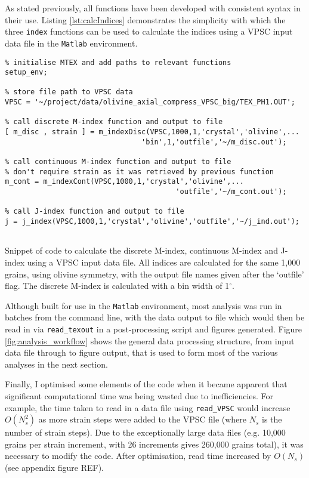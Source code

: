 \documentclass[a4paper,12pt,twoside]{report}
\numberwithin{equation}{chapter}
\begin{document}
As stated previously, all functions have been developed with consistent syntax in their use. Listing \ref{lst:calcIndices} demonstrates the simplicity with which the three \texttt{index} functions can be used to calculate the indices using a VPSC input data file in the \texttt{Matlab} environment.

\begin{program}[htbp] 
   \centering
   \begin{lstlisting}
% initialise MTEX and add paths to relevant functions
setup_env;   
   
% store file path to VPSC data
VPSC = '~/project/data/olivine_axial_compress_VPSC_big/TEX_PH1.OUT';

% call discrete M-index function and output to file
[ m_disc , strain ] = m_indexDisc(VPSC,1000,1,'crystal','olivine',...
                                'bin',1,'outfile','~/m_disc.out');

% call continuous M-index function and output to file
% don't require strain as it was retrieved by previous function
m_cont = m_indexCont(VPSC,1000,1,'crystal','olivine',...
                                        'outfile','~/m_cont.out');

% call J-index function and output to file
j = j_index(VPSC,1000,1,'crystal','olivine','outfile','~/j_ind.out');


 \end{lstlisting}
   \caption{Snippet of code to calculate the discrete M-index, continuous M-index and J-index using a VPSC input data file. All indices are calculated for the same 1,000 grains, using olivine symmetry, with the output file names given after the \lq{}outfile\rq{} flag. The discrete M-index is calculated with a bin width of 1$^\circ$.}
   \label{lst:calcIndices}
\end{program}

Although built for use in the \texttt{Matlab} environment, most analysis was run in batches from the command line, with the data output to file which would then be read in via \texttt{read\_{}texout} in a post-processing script and figures generated. Figure \ref{fig:analysis_workflow} shows the general data processing structure, from input data file through to figure output, that is used to form most of the various analyses in the next section.

Finally, I optimised some elements of the code when it became apparent that significant computational time was being wasted due to inefficiencies. For example, the time taken to read in a data file using \texttt{read\_{}VPSC} would increase $O(N_s^2)$ as more strain steps were added to the VPSC file (where $N_s$ is the number of strain steps). Due to the exceptionally large data files (e.g. 10,000 grains per strain increment, with 26 increments gives 260,000 grains total), it was necessary to modify the code. After optimisation, read time increased by $O(N_s)$ (see appendix figure REF). 
\end{document}
